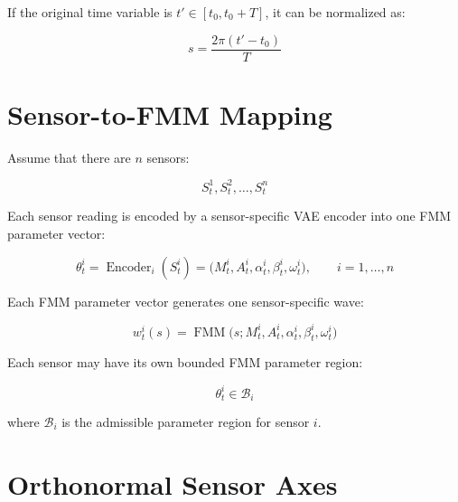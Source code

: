 \documentclass[a4paper]{article}
\newcommand{\FMM}{\operatorname{FMM}}
\newcommand{\Encoder}{\operatorname{Encoder}}
\begin{document}
        If the original time variable is \(t' \in [t_0,t_0+T]\), it can be normalized as:
        
        \begin{equation}
            s
            =
            \frac{2\pi(t'-t_0)}{T}
        \end{equation}
    
    
    \section{Sensor-to-FMM Mapping}
        
        Assume that there are \(n\) sensors:
        
        \begin{equation}
            S_t^1,
            S_t^2,
            \ldots,
            S_t^n
        \end{equation}
        
        Each sensor reading is encoded by a sensor-specific VAE encoder into one FMM parameter vector:
        
        \begin{equation}
            \theta_t^i
            =
            \Encoder_i(S_t^i)
            =
            \bigl(
            M_t^i,
            A_t^i,
            \alpha_t^i,
            \beta_t^i,
            \omega_t^i
            \bigr),
            \qquad
            i=1,\ldots,n
        \end{equation}
        
        Each FMM parameter vector generates one sensor-specific wave:
        
        \begin{equation}
            w_t^i(s)
            =
            \FMM
            \bigl(
            s;
            M_t^i,
            A_t^i,
            \alpha_t^i,
            \beta_t^i,
            \omega_t^i
            \bigr)
        \end{equation}
        
        Each sensor may have its own bounded FMM parameter region:
        
        \begin{equation}
            \theta_t^i
            \in
            \mathcal{B}_i
        \end{equation}
        
        where \(\mathcal{B}_i\) is the admissible parameter region for sensor \(i\).
    
    
    \section{Orthonormal Sensor Axes}
        
\end{document}
